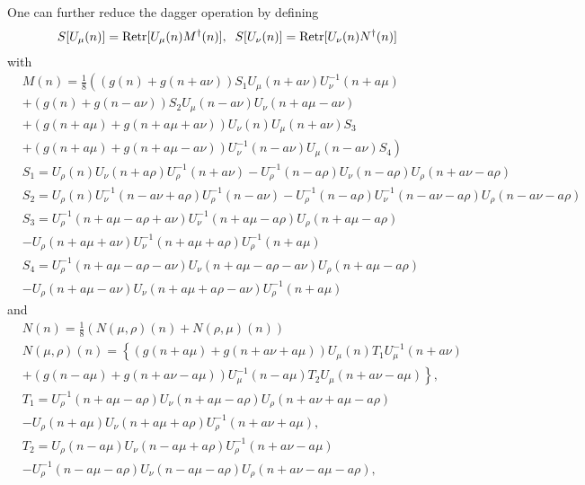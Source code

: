 One can further reduce the dagger operation by defining
\begin{equation}
\begin{split}
&S[U_{\mu}(n)]={\rm Retr}[U_{\mu}(n)M^{\dagger}(n)],\;\; S[U_{\nu}(n)]={\rm Retr}[U_{\nu}(n)N^{\dagger}(n)]
\end{split}
\end{equation}
with
\textcolor[rgb]{0,0,0.8}{
\begin{equation}
\begin{split}
&M(n)=\frac{1}{8}\left((g(n)+g(n+a\nu))S_1U_{\mu}(n+a\nu)U^{-1}_{\nu}(n+a\mu)\right.\\
&\left.+(g(n)+g(n-a\nu))S_2U_{\mu}(n-a\nu)U_{\nu}(n+a\mu-a\nu)\right.\\
&\left.+(g(n+a\mu)+g(n+a\mu+a\nu))U_{\nu}(n)U_{\mu}(n+a\nu)S_3\right.\\
&\left.+(g(n+a\mu)+g(n+a\mu-a\nu))U^{-1}_{\nu}(n-a\nu)U_{\mu}(n-a\nu)S_4\right)\\
&S_1=U_{\rho}(n)U_{\nu}(n+a\rho)U^{-1}_{\rho}(n+a\nu)-U^{-1}_{\rho}(n-a\rho)U_{\nu}(n-a\rho)U_{\rho}(n+a\nu-a\rho)\\
&S_2=U_{\rho}(n)U^{-1}_{\nu}(n-a\nu+a\rho)U^{-1}_{\rho}(n-a\nu)-U^{-1}_{\rho}(n-a\rho)U^{-1}_{\nu}(n-a\nu-a\rho)U_{\rho}(n-a\nu-a\rho)\\
&S_3=U^{-1}_{\rho}(n+a\mu-a\rho+a\nu)U^{-1}_{\nu}(n+a\mu-a\rho)U_{\rho}(n+a\mu-a\rho)\\
&-U_{\rho}(n+a\mu+a\nu)U^{-1}_{\nu}(n+a\mu+a\rho)U^{-1}_{\rho}(n+a\mu)\\
&S_4=U^{-1}_{\rho}(n+a\mu-a\rho-a\nu)U_{\nu}(n+a\mu-a\rho-a\nu)U_{\rho}(n+a\mu-a\rho)\\
&-U_{\rho}(n+a\mu-a\nu)U_{\nu}(n+a\mu+a\rho-a\nu)U^{-1}_{\rho}(n+a\mu)
\end{split}
\end{equation}
}
and
\textcolor[rgb]{0,0,0.8}{
\begin{equation}
\begin{split}
&N(n)=\frac{1}{8}(N(\mu,\rho)(n)+N(\rho,\mu)(n))\\
&N(\mu,\rho)(n)=\left\{(g(n+a\mu)+g(n+a\nu+a\mu))U_{\mu}(n)T_1U^{-1}_{\mu}(n+a\nu)\right.\\
&\left.+(g(n-a\mu)+g(n+a\nu-a\mu))U^{-1}_{\mu}(n-a\mu)T_2U_{\mu}(n+a\nu-a\mu)\right\},\\
&T_1=U^{-1}_{\rho}(n+a\mu-a\rho)U_{\nu}(n+a\mu-a\rho)U_{\rho}(n+a\nu+a\mu-a\rho)\\
&-U_{\rho}(n+a\mu)U_{\nu}(n+a\mu+a\rho)U^{-1}_{\rho}(n+a\nu+a\mu),\\
&T_2=U_{\rho}(n-a\mu)U_{\nu}(n-a\mu+a\rho)U^{-1}_{\rho}(n+a\nu-a\mu)\\
&-U^{-1}_{\rho}(n-a\mu-a\rho)U_{\nu}(n-a\mu-a\rho)U_{\rho}(n+a\nu-a\mu-a\rho),\\
\end{split}
\end{equation}
}

